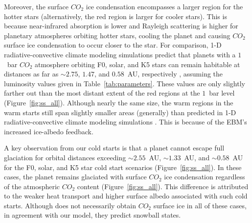 \documentclass[fleqn,usenatbib]{mnras}
\begin{document}
Moreover, the surface $CO_{\mathrm{2}}$ ice condensation encompasses a larger region for the hotter stars (alternatively, the red region is larger for cooler stars). This is because near-infrared absorption is lower and Rayleigh scattering is higher for planetary atmospheres orbiting hotter stars, cooling the planet and causing $CO_{\mathrm{2}}$ surface ice condensation to occur closer to the star. For comparison, 1-D radiative-convective climate modeling simulations predict that planets with a $1$~bar $CO_{\mathrm{2}}$ atmosphere orbiting F0, solar, and K5 stars can remain habitable at distances as far as $\sim 2.75$, $1.47$, and $0.58$~AU, respectively \citep{kasting1993, KumarKopparapu2013,Ramirez2018}, assuming the luminosity values given in Table~\ref{tab:parameters}. These values are only slightly farther out than the most distant extent of the red regions at the $1$~bar level (Figure~\ref{fig:ss_all}). Although nearly the same size, the warm regions in the warm starts still span slightly smaller areas (generally) than predicted in 1-D radiative-convective climate modeling simulations \citep{kasting1993, KumarKopparapu2013,Ramirez2018}. This is because of the EBM's increased ice-albedo feedback.

A key observation from our cold starts is that a planet cannot escape full glaciation for orbital distances exceeding $\sim 2.55$~AU, $\sim1.33$~AU, and $\sim0.58$~AU for the F0, solar, and K5 star cold start scenarios (Figure~\ref{fig:ss_all}). In these cases, the planet remains glaciated with surface $CO_{\mathrm{2}}$ ice condensation regardless of the atmospheric $CO_{\mathrm{2}}$ content (Figure~\ref{fig:ss_all}). This difference is attributed to the weaker heat transport and higher surface albedo associated with such cold starts. Although \citet{Turbet2017} does not necessarily obtain $CO_{\mathrm{2}}$ surface ice in all of these cases, in agreement with our model, they predict snowball states. 
\end{document}
